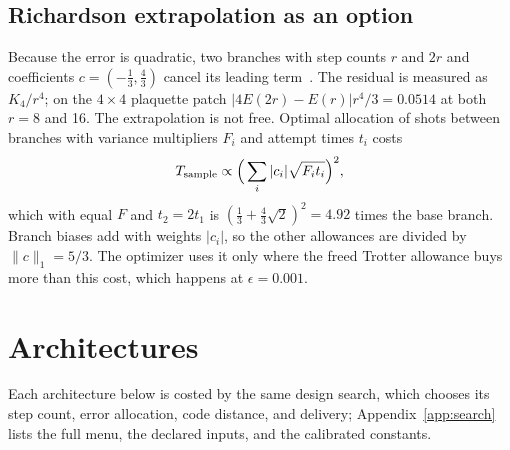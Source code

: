 \documentclass[11pt]{article}
\newcommand{\eps}{\epsilon}
\begin{document}
\subsection{Richardson extrapolation as an option}
Because the error is quadratic, two branches with step counts $r$ and $2r$
and coefficients $c=(-\tfrac13,\tfrac43)$ cancel its leading
term~\cite{endo2019algorithmic,low2019multiproduct}. The residual is measured
as $K_4/r^4$; on the $4\times4$ plaquette patch $|4E(2r)-E(r)|r^4/3=0.0514$ at
both $r=8$ and 16. The extrapolation is not free. Optimal allocation of shots
between branches with variance multipliers $F_i$ and attempt times $t_i$ costs
\begin{equation}\label{eq:richardson}
 T_{\rm sample}\propto\Big(\sum_i|c_i|\sqrt{F_it_i}\Big)^2,
\end{equation}
which with equal $F$ and $t_2=2t_1$ is $(\tfrac13+\tfrac43\sqrt2)^2=4.92$ times
the base branch. Branch biases add with weights $|c_i|$, so the other
allowances are divided by $\|c\|_1=5/3$. The optimizer uses it only where the
freed Trotter allowance buys more than this cost, which happens at
$\eps=0.001$.

\section{Architectures}\label{sec:architectures}
Each architecture below is costed by the same design search, which chooses its
step count, error allocation, code distance, and delivery; Appendix~\ref{app:search}
lists the full menu, the declared inputs, and the calibrated constants.
\end{document}
